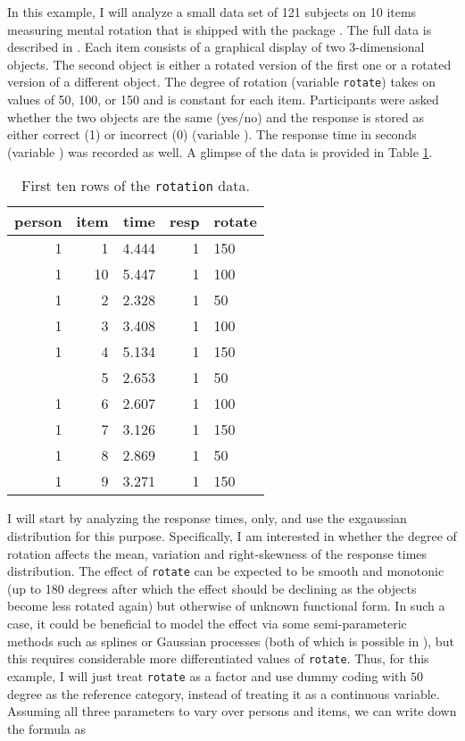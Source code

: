 \documentclass[jss]{jss}
\begin{document}
In this example, I will analyze a small data set of 121 subjects on 10
items measuring mental rotation that is shipped with the 
package \citetext{\citealp{diffIRT}; \citealp[see
also][]{vandermaas2011}}. The full data is described in
\citet{borst2011}. Each item consists of a graphical display of two
3-dimensional objects. The second object is either a rotated version of
the first one or a rotated version of a different object. The degree of
rotation (variable \texttt{rotate}) takes on values of 50, 100, or 150
and is constant for each item. Participants were asked whether the two
objects are the same (yes/no) and the response is stored as either
correct (1) or incorrect (0) (variable ). The response time
in seconds (variable ) was recorded as well. A glimpse of the
data is provided in Table \ref{tab:head-rotation}.

\begin{CodeChunk}
\begin{table}[t]

\caption{\label{tab:head-rotation}First ten rows of the \texttt{rotation} data.}
\centering
\begin{tabular}{rrrrl}
\toprule
person & item & time & resp & rotate\\
\midrule
1 & 1 & 4.444 & 1 & 150\\
1 & 10 & 5.447 & 1 & 100\\
1 & 2 & 2.328 & 1 & 50\\
1 & 3 & 3.408 & 1 & 100\\
1 & 4 & 5.134 & 1 & 150\\
\addlinespace
1 & 5 & 2.653 & 1 & 50\\
1 & 6 & 2.607 & 1 & 100\\
1 & 7 & 3.126 & 1 & 150\\
1 & 8 & 2.869 & 1 & 50\\
1 & 9 & 3.271 & 1 & 150\\
\bottomrule
\end{tabular}
\end{table}

\end{CodeChunk}

I will start by analyzing the response times, only, and use the
exgaussian distribution for this purpose. Specifically, I am interested
in whether the degree of rotation affects the mean, variation and
right-skewness of the response times distribution. The effect of
\texttt{rotate} can be expected to be smooth and monotonic (up to 180
degrees after which the effect should be declining as the objects become
less rotated again) but otherwise of unknown functional form. In such a
case, it could be beneficial to model the effect via some
semi-parameteric methods such as splines or Gaussian processes (both of
which is possible in ), but this requires considerable more
differentiated values of \texttt{rotate}. Thus, for this example, I will
just treat \texttt{rotate} as a factor and use dummy coding with \(50\)
degree as the reference category, instead of treating it as a continuous
variable. Assuming all three parameters to vary over persons and items,
we can write down the formula as
\end{document}
